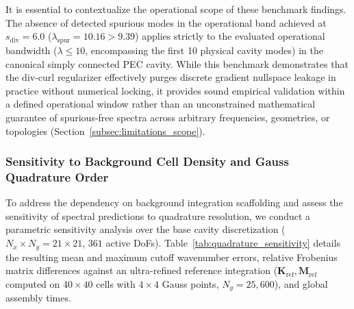 \documentclass[preprint,12pt]{elsarticle}
\begin{document}
It is essential to contextualize the operational scope of these benchmark findings. The absence of detected spurious modes in the operational band achieved at $s_{\mathrm{div}} = 6.0$ ($\lambda_{\mathrm{spur}} = 10.16 > 9.39$) applies strictly to the evaluated operational bandwidth ($\lambda \le 10$, encompassing the first 10 physical cavity modes) in the canonical simply connected PEC cavity. While this benchmark demonstrates that the div-curl regularizer effectively purges discrete gradient nullspace leakage in practice without numerical locking, it provides sound empirical validation within a defined operational window rather than an unconstrained mathematical guarantee of spurious-free spectra across arbitrary frequencies, geometries, or topologies (Section~\ref{subsec:limitations_scope}).

\subsubsection{Sensitivity to Background Cell Density and Gauss Quadrature Order}
\label{subsubsec:quadrature_sensitivity}

To address the dependency on background integration scaffolding and assess the sensitivity of spectral predictions to quadrature resolution, we conduct a parametric sensitivity analysis over the base cavity discretization ($N_x \times N_y = 21 \times 21$, $361$ active DoFs). Table~\ref{tab:quadrature_sensitivity} details the resulting mean and maximum cutoff wavenumber errors, relative Frobenius matrix differences against an ultra-refined reference integration ($\mathbf{K}_{\mathrm{ref}}, \mathbf{M}_{\mathrm{ref}}$ computed on $40 \times 40$ cells with $4 \times 4$ Gauss points, $N_g = 25{,}600$), and global assembly times.
\end{document}
